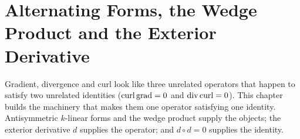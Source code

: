 \chapter{Alternating Forms, the Wedge Product and the Exterior Derivative}
\label{ch:differential_forms}

Gradient, divergence and curl look like three unrelated operators that happen to satisfy two
unrelated identities ($\operatorname{curl}\operatorname{grad} = 0$ and $\operatorname{div}\operatorname{curl} = 0$). This chapter builds the
machinery that makes them one operator satisfying one identity. Antisymmetric $k$-linear forms
and the wedge product supply the objects; the exterior derivative $d$ supplies the operator; and
$d \circ d = 0$ supplies the identity.




